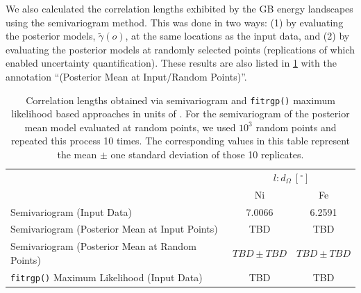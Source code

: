 \documentclass[final,twocolumn,12pt]{elsarticle}
\begin{document}
	We also calculated the correlation lengths exhibited by the GB energy landscapes using the semivariogram method. This was done in two ways: (1) by evaluating the posterior models, $\widetilde{\gamma}\!\left(o\right)$, at the same locations as the input data, and (2) by evaluating the posterior models at randomly selected points (replications of which enabled uncertainty quantification). These results are also listed in \cref{tab:globalcorrelationlengths} with the annotation ``(Posterior Mean at Input/Random Points)''.
	\begin{table}[]
	    \centering
	    \caption{Correlation lengths obtained via semivariogram and \texttt{fitrgp()} maximum likelihood based approaches in units of \SI{}{\tobydeg}. For the semivariogram of the posterior mean model evaluated at random points, we used $10^3$ random points and repeated this process 10 times. The corresponding values in this table represent the mean $\pm$ one standard deviation of those 10 replicates.}
	    \label{tab:globalcorrelationlengths}
	    \begin{tabular}{l c c}
	    \toprule
	         & \multicolumn{2}{c}{$l: d_\Omega\ [{}^{\circ}]$} \\
	         \cline{2-3}
	         & Ni & Fe \rule{0pt}{2.6ex}\\
	         \midrule
	         Semivariogram (Input Data) & 7.0066 & 6.2591 \\
	         Semivariogram (Posterior Mean at Input Points) & TBD & TBD \\ 
	         Semivariogram (Posterior Mean at Random Points) & $TBD \pm TBD$ & $TBD \pm TBD$ \\
	         \texttt{fitrgp()} Maximum Likelihood (Input Data) & TBD & TBD \\
	         \bottomrule
	    \end{tabular}
	\end{table}
\end{document}

